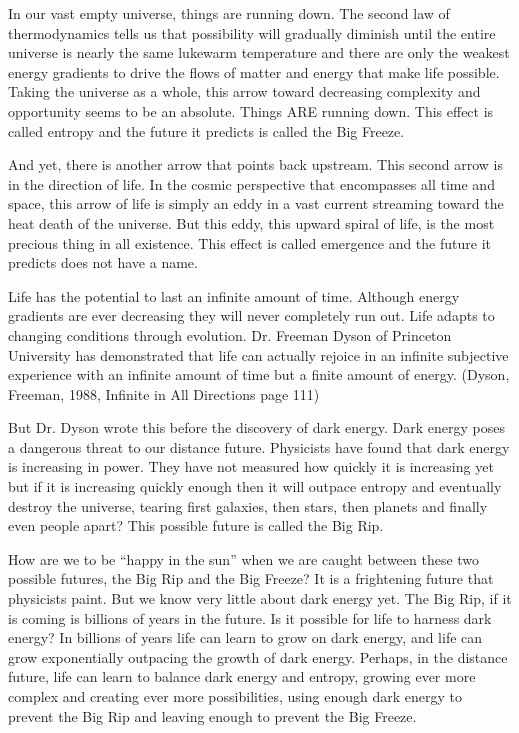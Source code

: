 \documentclass[ebook,11pt,openany,twoside,showtrims]{memoir}
\begin{document}
In our vast empty universe, things are running down. The second law of
thermodynamics tells us that possibility will gradually diminish until the
entire universe is nearly the same lukewarm temperature and there are only the
weakest energy gradients to drive the flows of matter and energy that make life
possible. Taking the universe as a whole, this arrow toward decreasing
complexity and opportunity seems to be an absolute. Things ARE running down.
This effect is called entropy and the future it predicts is called the Big
Freeze.

And yet, there is another arrow that points back upstream. This second arrow is
in the direction of life. In the cosmic perspective that encompasses all time
and space, this arrow of life is simply an eddy in a vast current streaming
toward the heat death of the universe. But this eddy, this upward spiral of
life, is the most precious thing in all existence. This effect is called
emergence and the future it predicts does not have a name.

Life has the potential to last an infinite amount of time. Although energy
gradients are ever decreasing they will never completely run out. Life adapts
to changing conditions through evolution. Dr. Freeman Dyson of Princeton
University has demonstrated that life can actually rejoice in an infinite
subjective experience with an infinite amount of time but a finite amount of
energy. (Dyson, Freeman, 1988, Infinite in All Directions page 111)

But Dr. Dyson wrote this before the discovery of dark energy. Dark energy poses
a dangerous threat to our distance future. Physicists have found that dark
energy is increasing in power. They have not measured how quickly it is
increasing yet but if it is increasing quickly enough then it will outpace
entropy and eventually destroy the universe, tearing first galaxies, then
stars, then planets and finally even people apart? This possible future is
called the Big Rip.

How are we to be ``happy in the sun'' when we are caught between these two
possible futures, the Big Rip and the Big Freeze? It is a frightening future
that physicists paint. But we know very little about dark energy yet. The Big
Rip, if it is coming is billions of years in the future. Is it possible for
life to harness dark energy? In billions of years life can learn to grow on
dark energy, and life can grow exponentially outpacing the growth of dark
energy. Perhaps, in the distance future, life can learn to balance dark energy
and entropy, growing ever more complex and creating ever more possibilities,
using enough dark energy to prevent the Big Rip and leaving enough to prevent
the Big Freeze.
\end{document}
